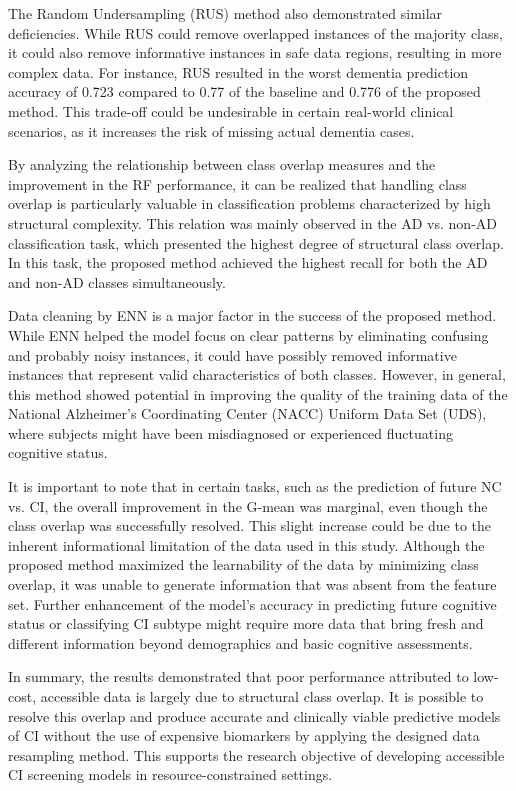 The Random Undersampling (\acrshort{RUS}) method also demonstrated similar deficiencies. While RUS could remove overlapped instances of the majority class, it could also remove informative instances in safe data regions, resulting in more complex data. For instance, RUS resulted in the worst dementia prediction accuracy of 0.723 compared to 0.77 of the baseline and 0.776 of the proposed method. This trade-off could be undesirable in certain real-world clinical scenarios, as it increases the risk of missing actual dementia cases.

By analyzing the relationship between class overlap measures and the improvement in the RF performance, it can be realized that handling class overlap is particularly valuable in classification problems characterized by high structural complexity. This relation was mainly observed in the AD vs. non-AD classification task, which presented the highest degree of structural class overlap. In this task, the proposed method achieved the highest recall for both the AD and non-AD classes simultaneously.

Data cleaning by ENN is a major factor in the success of the proposed method. While ENN helped the model focus on clear patterns by eliminating confusing and probably noisy instances, it could have possibly removed informative instances that represent valid characteristics of both classes. However, in general, this method showed potential in improving the quality of the training data of the National Alzheimer's Coordinating Center (\acrshort{NACC}) Uniform Data Set (\acrshort{UDS}), where subjects might have been misdiagnosed or experienced fluctuating cognitive status.

It is important to note that in certain tasks, such as the prediction of future NC vs. CI, the overall improvement in the G-mean was marginal, even though the class overlap was successfully resolved. This slight increase could be due to the inherent informational limitation of the data used in this study. Although the proposed method maximized the learnability of the data by minimizing class overlap, it was unable to generate information that was absent from the feature set. Further enhancement of the model's accuracy in predicting future cognitive status or classifying CI subtype might require more data that bring fresh and different information beyond demographics and basic cognitive assessments.

In summary, the results demonstrated that poor performance attributed to low-cost, accessible data is largely due to structural class overlap. It is possible to resolve this overlap and produce accurate and clinically viable predictive models of CI without the use of expensive biomarkers by applying the designed data resampling method. This supports the research objective of developing accessible CI screening models in resource-constrained settings.

